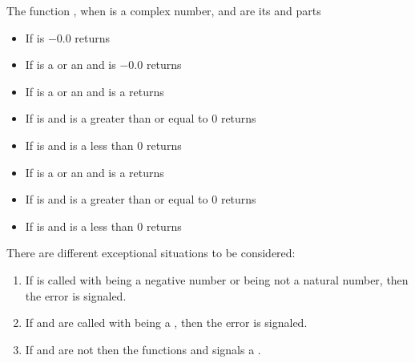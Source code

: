 \documentclass[../Comparisons-Predicates.tex]{subfiles}
\begin{document}
\noindent
The function , when  is a complex number, 
and  are its  and  parts
\begin{itemize}
\item If  is $-0.0$ returns 
  \code{))}
\item If  is a  or an
   and
   is
  $-0.0$ returns 
\item If  is a  or an
   and
   is a
   returns 
\item If  is  and
   is a greater than or equal to $0$ returns
\item If  is  and
   is a less than $0$ returns 
\item If  is a  or an
   and
   is a
   returns 
\item If  is  and
   is a greater than or equal to $0$ returns 
\item If  is  and
   is a less than $0$ returns 
\end{itemize}


\DExceptional{}

There are different exceptional situations to be considered:
\begin{enumerate}
\item If  is called with  being a negative
  number or being not a natural number, then the
   error
  is signaled.
\item If  and  are called with
   being a , then the
   error is signaled.
\item If  and  are not \CL{}
   then the functions  and 
  signals a .
\end{enumerate}
\end{document}
